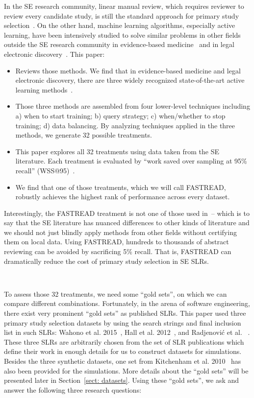 \documentclass{svjour3}
\theoremstyle{break}
\newcommand{\respto}[1]{
\fcolorbox{black}{black!15}{
\label{response:#1}
\bf
  \scriptsize R-{#1}}~
}
\begin{document}
In the SE research community, linear manual review, which requires reviewer to review every candidate study, is still the standard approach for primary study selection~\cite{kitchenham2013systematic}. On the other hand, machine learning algorithms, especially active learning, have been intensively studied to solve similar problems in other fields outside the SE research community in evidence-based medicine~\cite{paynter2016epc,wallace2010semi,wallace2010active} and in
legal electronic discovery~\cite{cormack2014evaluation,cormack2015autonomy}. This paper:
\begin{itemize}
\item
Reviews those methods. We find that in evidence-based medicine and legal electronic discovery, there are three widely recognized state-of-the-art active learning methods~\cite{cormack2014evaluation,wallace2010semi,miwa2014reducing}.
\item
Those three methods are assembled from four lower-level techniques including a) when to start training; b) query strategy; c) when/whether to stop training; d) data balancing. By analyzing techniques applied in the three methods, we generate 32 possible treatments.
\item
This paper explores all 32 treatments using data taken from the SE literature. Each treatment is evaluated by ``work saved over sampling at 95\% recall'' (WSS@95)~\cite{cohen2011performance}. 
\item
We find that one of those treatments, which we will call FASTREAD, robustly achieves the highest rank of performance across every dataset.
\end{itemize}
Interestingly, the FASTREAD treatment is not one of those used
in~\cite{cormack2014evaluation,wallace2010semi,miwa2014reducing}-- which is to say that the SE literature has nuanced differences to other kinds of literature and we should not just blindly
apply methods from other fields without certifying them on local data.
Using FASTREAD, hundreds to thousands of abstract reviewing can be avoided by sacrificing 5\% recall. That is, FASTREAD can dramatically reduce the cost of primary study selection in SE SLRs.
   
\respto{2e2}
To assess those 32 treatments,
we need some ``gold sets'',
on which we can compare different combinations. Fortunately, in the arena of software engineering, there exist very prominent ``gold sets'' as published SLRs. This paper used three  primary study selection datasets by using the search strings and final inclusion list in such SLRs: Wahono et al. 2015~\cite{wahono2015systematic}, Hall et
al. 2012~\cite{hall2012systematic}, and Radjenovi{\'c} et al. ~\cite{radjenovic2013software}. These three SLRs are arbitrarily chosen from the set of SLR publications which define their work in enough details for us to construct datasets for simulations. Besides the three synthetic datasets, one set from Kitchenham et al. 2010~\cite{kitchenham2010systematic} has also been provided for the simulations. More details about the ``gold
sets'' will be presented later in Section~\ref{sect: datasets}. Using
these ``gold sets'', we ask and answer the following three research questions:
\end{document}
